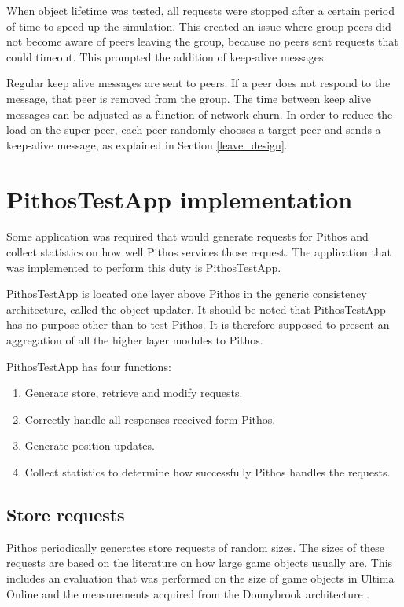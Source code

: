 When object lifetime was tested, all requests were stopped after a certain period of time to speed up the simulation. This created an issue where group peers did not become aware of peers leaving the group, because no peers sent requests that could timeout. This prompted the addition of keep-alive messages.

Regular keep alive messages are sent to peers. If a peer does not respond to the message, that peer is removed from the group. The time between keep alive messages can be adjusted as a function of network churn. In order to reduce the load on the super peer, each peer randomly chooses a target peer and sends a keep-alive message, as explained in Section \ref{leave_design}.

\section{PithosTestApp implementation}
\label{pithostestapp}

Some application was required that would generate requests for Pithos and collect statistics on how well Pithos services those request. The application that was implemented to perform this duty is PithosTestApp.

PithosTestApp is located one layer above Pithos in the generic consistency architecture, called the object updater. It should be noted that PithosTestApp has no purpose other than to test Pithos. It is therefore supposed to present an aggregation of all the higher layer modules to Pithos.

PithosTestApp has four functions:
\begin{enumerate}
\item Generate store, retrieve and modify requests.
\item Correctly handle all responses received form Pithos.
\item Generate position updates.
\item Collect statistics to determine how successfully Pithos handles the requests.
\end{enumerate}

\subsection{Store requests}

Pithos periodically generates store requests of random sizes. The sizes of these requests are based on the literature on how large game objects usually are. This includes an evaluation that was performed on the size of game objects in Ultima Online and the measurements acquired from the Donnybrook architecture \cite{Bharambe_Donnybrook}.

